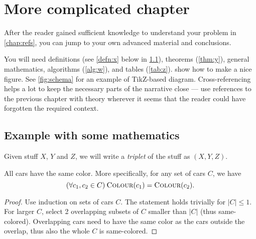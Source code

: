 \chapter{More complicated chapter}
\label{chap:math}

After the reader gained sufficient knowledge to understand your problem in \cref{chap:refs}, you can jump to your own advanced material and conclusions.

You will need definitions (see \cref{defn:x} below in \cref{sec:demo}), theorems (\cref{thm:y}), general mathematics, algorithms (\cref{alg:w}), and tables (\cref{tab:z}).  show how to make a nice figure. See \cref{fig:schema} for an example of TikZ-based diagram. Cross-referencing helps a lot to keep the necessary parts of the narrative close --- use references to the previous chapter with theory wherever it seems that the reader could have forgotten the required context.

\section{Example with some mathematics}
\label{sec:demo}

\begin{defn}[Triplet]\label{defn:x}
Given stuff $X$, $Y$ and $Z$, we will write a \emph{triplet} of the stuff as $(X,Y,Z)$.
\end{defn}

\newcommand{\Col}{\textsc{Colour}}

\begin{thm}\label{thm:y}
All cars have the same color. More specifically, for any set of cars $C$, we have
$$(\forall c_1, c_2 \in C)\:\Col(c_1) = \Col(c_2).$$
\end{thm}

\begin{proof}
Use induction on sets of cars $C$. The statement holds trivially for $|C|\leq1$. For larger $C$, select 2 overlapping subsets of $C$ smaller than $|C|$ (thus same-colored). Overlapping cars need to have the same color as the cars outside the overlap, thus also the whole $C$ is same-colored.
\end{proof}

